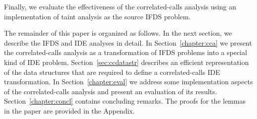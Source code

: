  Finally, we evaluate the effectiveness of the correlated-calls analysis using an implementation of taint analysis as the source IFDS problem.

The remainder of this paper is organized as follows. In the next section, we describe the IFDS and IDE analyses in detail. In Section~\ref{chapter:cca} we present the correlated-calls analysis as a transformation of IFDS problems into a special kind of IDE problem. Section~\ref{sec:ccdatastr} describes an efficient representation of the data structures that are required to define a correlated-calls IDE transformation.
In Section~\ref{chapter:eval} we address some implementation aspects of the correlated-calls analysis and present an evaluation of its results. Section~\ref{chapter:concl} contains concluding remarks. The proofs for the lemmas in the paper are provided in the Appendix.
